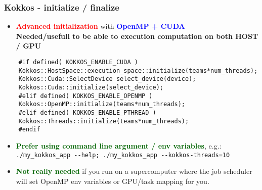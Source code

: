 \begin{frame}[fragile=singleslide]
  \frametitle{Kokkos - initialize / finalize}

  \begin{itemize}
  \item \textcolor{red}{\textbf{Advanced initialization}} with \textcolor{blue}{\textbf{OpenMP + CUDA}}\\
    \textbf{Needed/usefull to be able to execution computation on both HOST / GPU}
  \end{itemize}
  \begin{verbatim}
    #if defined( KOKKOS_ENABLE_CUDA )
    Kokkos::HostSpace::execution_space::initialize(teams*num_threads);
    Kokkos::Cuda::SelectDevice select_device(device);
    Kokkos::Cuda::initialize(select_device);
    #elif defined( KOKKOS_ENABLE_OPENMP )
    Kokkos::OpenMP::initialize(teams*num_threads);
    #elif defined( KOKKOS_ENABLE_PTHREAD )
    Kokkos::Threads::initialize(teams*num_threads);
    #endif
  \end{verbatim}
  \begin{itemize}
  \item \textcolor{darkgreen}{\bf Prefer using command line argument / env variables}, e.g.:\\
    \texttt{./my\_kokkos\_app \--\--help; ./my\_kokkos\_app \--\--kokkos-threads=10}
  \item \textcolor{darkgreen}{\bf Not really needed} if you run on a supercomputer where the job scheduler will set OpenMP env variables or GPU/task mapping for you.
  \end{itemize}
\end{frame}



